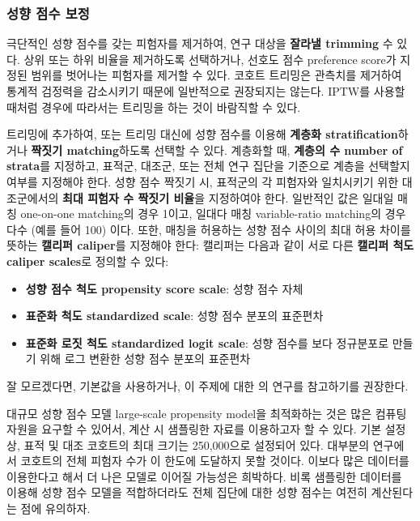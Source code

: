 \documentclass[10.5pt]{book}
\providecommand{\tightlist}{%
  \setlength{\itemsep}{0pt}\setlength{\parskip}{0pt}}
\theoremstyle{definition}
\theoremstyle{definition}
\theoremstyle{definition}
\theoremstyle{remark}
\begin{document}
\subsubsection*{성향 점수 보정}\label{--}

극단적인 성향 점수를 갖는 피험자를 제거하여, 연구 대상을 \textbf{잘라낼
trimming} 수 있다. 상위 또는 하위 비율을 제거하도록 선택하거나, 선호도
점수 preference score가 지정된 범위를 벗어나는 피험자를 제거할 수 있다.
코호트 트리밍은 관측치를 제거하여 통계적 검정력을 감소시키기 때문에
일반적으로 권장되지는 않는다. IPTW를 사용할 때처럼 경우에 따라서는
트리밍을 하는 것이 바람직할 수 있다. 

트리밍에 추가하여, 또는 트리밍 대신에 성향 점수를 이용해 \textbf{계층화
stratification}하거나 \textbf{짝짓기 matching}하도록 선택할 수 있다.
계층화할 때, \textbf{계층의 수 number of strata}를 지정하고, 표적군,
대조군, 또는 전체 연구 집단을 기준으로 계층을 선택할지 여부를 지정해야
한다. 성향 점수 짝짓기 시, 표적군의 각 피험자와 일치시키기 위한
대조군에서의 \textbf{최대 피험자 수 짝짓기 비율}을 지정하여야 한다.
일반적인 값은 일대일 매칭 one-on-one matching의 경우 1이고, 일대다 매칭
variable-ratio matching의 경우 다수 (예를 들어 100) 이다. 또한, 매칭을
허용하는 성향 점수 사이의 최대 허용 차이를 뜻하는 \textbf{캘리퍼
caliper}를 지정해야 한다: 캘리퍼는 다음과 같이 서로 다른 \textbf{캘리퍼
척도 caliper scales}로 정의할 수 있다: 

\begin{itemize}
\tightlist
\item
  \textbf{성향 점수 척도 propensity score scale}: 성향 점수 자체
\item
  \textbf{표준화 척도 standardized scale}: 성향 점수 분포의 표준편차
\item
  \textbf{표준화 로짓 척도 standardized logit scale}: 성향 점수를 보다
  정규분포로 만들기 위해 로그 변환한 성향 점수 분포의 표준편차
\end{itemize}

잘 모르겠다면, 기본값을 사용하거나, 이 주제에 대한 \citet{austin_2011}
의 연구를 참고하기를 권장한다.

대규모 성향 점수 모델 large-scale propensity model을 최적화하는 것은
많은 컴퓨팅 자원을 요구할 수 있어서, 계산 시 샘플링한 자료를 이용하고자
할 수 있다. 기본 설정상, 표적 및 대조 코호트의 최대 크기는 250,000으로
설정되어 있다. 대부분의 연구에서 코호트의 전체 피험자 수가 이 한도에
도달하지 못할 것이다. 이보다 많은 데이터를 이용한다고 해서 더 나은
모델로 이어질 가능성은 희박하다. 비록 샘플링한 데이터를 이용해 성향 점수
모델을 적합하더라도 전체 집단에 대한 성향 점수는 여전히 계산된다는 점에
유의하자.
\end{document}
